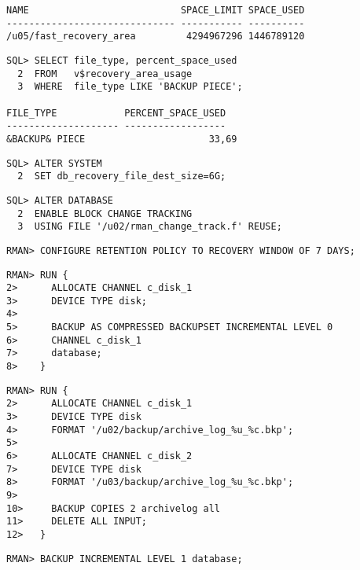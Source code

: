 \begin{enumerate}
\begin{lstlisting}[language=oracle_sql]
NAME                           SPACE_LIMIT SPACE_USED
------------------------------ ----------- ----------
/u05/fast_recovery_area         4294967296 1446789120
    \end{lstlisting}
\clearpage	
    
    \begin{lstlisting}[language=oracle_sql]
SQL> SELECT file_type, percent_space_used
  2  FROM   v$recovery_area_usage
  3  WHERE  file_type LIKE 'BACKUP PIECE';

FILE_TYPE            PERCENT_SPACE_USED
-------------------- ------------------
&BACKUP& PIECE                      33,69
    \end{lstlisting}
    
    \begin{lstlisting}[language=oracle_sql]
SQL> ALTER SYSTEM
  2  SET db_recovery_file_dest_size=6G;
    \end{lstlisting}
    
      \begin{lstlisting}[caption={Block Change Tracking aktivieren},language=oracle_sql]
SQL> ALTER DATABASE
  2  ENABLE BLOCK CHANGE TRACKING
  3  USING FILE '/u02/rman_change_track.f' REUSE;
      \end{lstlisting}
      \begin{lstlisting}[caption={Retention Policy setzen},language=rman]
RMAN> CONFIGURE RETENTION POLICY TO RECOVERY WINDOW OF 7 DAYS;
      \end{lstlisting}
      \begin{lstlisting}[caption={\oscommand{backup\_sunday\_level\_0.cmd}},language=rman]
RMAN> RUN {
2>      ALLOCATE CHANNEL c_disk_1
3>      DEVICE TYPE disk;
4>
5>      BACKUP AS COMPRESSED BACKUPSET INCREMENTAL LEVEL 0 
6>      CHANNEL c_disk_1
7>      database;
8>    }
      \end{lstlisting}
      \begin{lstlisting}[caption={\oscommand{backup\_archive\_log.cmd}},language=rman]
RMAN> RUN {
2>      ALLOCATE CHANNEL c_disk_1
3>      DEVICE TYPE disk
4>      FORMAT '/u02/backup/archive_log_%u_%c.bkp';
5>
6>      ALLOCATE CHANNEL c_disk_2
7>      DEVICE TYPE disk
8>      FORMAT '/u03/backup/archive_log_%u_%c.bkp';
9>
10>     BACKUP COPIES 2 archivelog all
11>     DELETE ALL INPUT;
12>   }
      \end{lstlisting}
      \begin{lstlisting}[caption={\oscommand{backup\_mon\_tue\_thu\_fri.cmd}},language=rman]
RMAN> BACKUP INCREMENTAL LEVEL 1 database;
      \end{lstlisting}

\end{enumerate}
